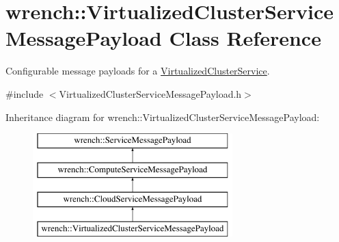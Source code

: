\hypertarget{classwrench_1_1_virtualized_cluster_service_message_payload}{}\section{wrench\+:\+:Virtualized\+Cluster\+Service\+Message\+Payload Class Reference}
\label{classwrench_1_1_virtualized_cluster_service_message_payload}


Configurable message payloads for a \hyperlink{classwrench_1_1_virtualized_cluster_service}{Virtualized\+Cluster\+Service}.  




{\ttfamily \#include $<$Virtualized\+Cluster\+Service\+Message\+Payload.\+h$>$}

Inheritance diagram for wrench\+:\+:Virtualized\+Cluster\+Service\+Message\+Payload\+:\begin{figure}[H]
\begin{center}
\leavevmode
\includegraphics[height=4.000000cm]{classwrench_1_1_virtualized_cluster_service_message_payload}
\end{center}
\end{figure}
